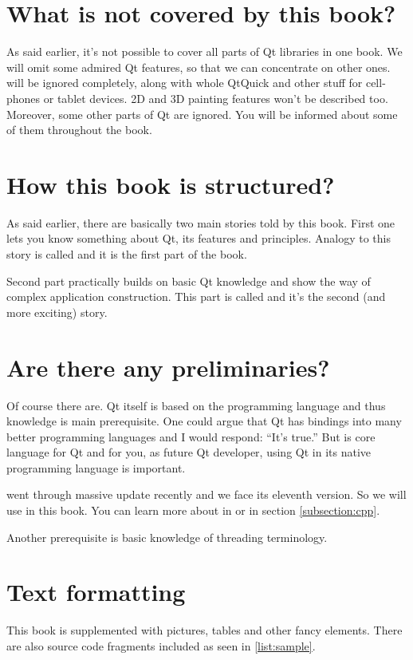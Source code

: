 \section*{What is not covered by this book?}
As said earlier, it's not possible to cover all parts of Qt libraries in one book. We will omit some admired Qt features, so that we can concentrate on other ones.  will be ignored completely, along with whole QtQuick and other stuff for cell-phones or tablet devices. 2D and 3D painting features won't be described too. Moreover, some other parts of Qt are ignored. You will be informed about some of them throughout the book.

\vfill

\section*{How this book is structured?}
As said earlier, there are basically two main stories told by this book. First one lets you know something about Qt, its features and principles. Analogy to this story is called  and it is the first part of the book.

Second part practically builds on basic Qt knowledge and show the way of complex application construction. This part is called  and it's the second (and more exciting) story.

\section*{Are there any preliminaries?}
Of course there are. Qt itself is based on the \cpp programming language and thus \cpp knowledge is main prerequisite. One could argue that Qt has bindings into many better programming languages and I would respond: \enquote{It's true.} But \cpp is core language for Qt and for you, as future Qt developer, using Qt in its native programming language is important.

\cpp went through massive update recently and we face its eleventh version. So we will use  in this book. You can learn more about  in \citep{various:cppstandard} or in section \ref{subsection:cpp}.

Another prerequisite is basic knowledge of threading terminology.

\section*{Text formatting}
This book is supplemented with pictures, tables and other fancy elements. There are also source code fragments included as seen in \autoref{list:sample}.

